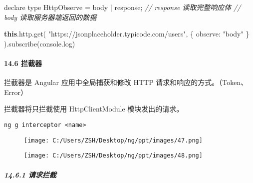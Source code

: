 \documentclass[
]{article}
\newenvironment{Shaded}{}{}
\newcommand{\AttributeTok}[1]{\textcolor[rgb]{0.49,0.56,0.16}{#1}}
\newcommand{\BuiltInTok}[1]{#1}
\newcommand{\CommentTok}[1]{\textcolor[rgb]{0.38,0.63,0.69}{\textit{#1}}}
\newcommand{\DataTypeTok}[1]{\textcolor[rgb]{0.56,0.13,0.00}{#1}}
\newcommand{\FunctionTok}[1]{\textcolor[rgb]{0.02,0.16,0.49}{#1}}
\newcommand{\KeywordTok}[1]{\textcolor[rgb]{0.00,0.44,0.13}{\textbf{#1}}}
\newcommand{\NormalTok}[1]{#1}
\newcommand{\OperatorTok}[1]{\textcolor[rgb]{0.40,0.40,0.40}{#1}}
\newcommand{\StringTok}[1]{\textcolor[rgb]{0.25,0.44,0.63}{#1}}
\begin{document}
\begin{Shaded}
\begin{Highlighting}[]
\NormalTok{declare type HttpObserve }\OperatorTok{=} \StringTok{\textquotesingle{}body\textquotesingle{}} \OperatorTok{|} \StringTok{\textquotesingle{}response\textquotesingle{}}\OperatorTok{;}
\CommentTok{// response 读取完整响应体}
\CommentTok{// body 读取服务器端返回的数据}
\end{Highlighting}
\end{Shaded}

\begin{Shaded}
\begin{Highlighting}[]
\KeywordTok{this}\OperatorTok{.}\AttributeTok{http}\OperatorTok{.}\FunctionTok{get}\NormalTok{(}
  \StringTok{"https://jsonplaceholder.typicode.com/users"}\OperatorTok{,} 
\NormalTok{  \{ }\DataTypeTok{observe}\OperatorTok{:} \StringTok{"body"}\NormalTok{ \}}
\NormalTok{)}\OperatorTok{.}\FunctionTok{subscribe}\NormalTok{(}\BuiltInTok{console}\OperatorTok{.}\FunctionTok{log}\NormalTok{)}
\end{Highlighting}
\end{Shaded}

\hypertarget{146-ux62e6ux622aux5668}{%
\paragraph{14.6 拦截器}\label{146-ux62e6ux622aux5668}}

拦截器是 Angular 应用中全局捕获和修改 HTTP
请求和响应的方式。（Token、Error）

拦截器将只拦截使用 HttpClientModule 模块发出的请求。

\texttt{ng\ g\ interceptor\ \textless{}name\textgreater{}}

\begin{figure}
\centering
\texttt{[image: C:/Users/ZSH/Desktop/ng/ppt/images/47.png]}
\caption{}
\end{figure}

\begin{figure}
\centering
\texttt{[image: C:/Users/ZSH/Desktop/ng/ppt/images/48.png]}
\caption{}
\end{figure}

\hypertarget{1461-ux8bf7ux6c42ux62e6ux622a}{%
\subparagraph{14.6.1 请求拦截}\label{1461-ux8bf7ux6c42ux62e6ux622a}}
\end{document}

